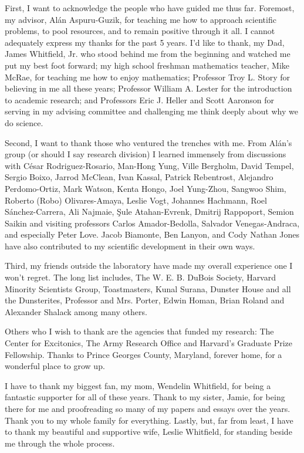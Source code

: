 \begin{acknowledgments}

First, I want to acknowledge the people who have guided me thus far. Foremost, my advisor, Al{\'a}n Aspuru-Guzik, for teaching me how to approach scientific problems, to pool resources, and to remain positive through it all.   I cannot adequately express my thanks for the past 5 years.  I'd like to thank, my Dad, James Whitfield, Jr. who stood behind me from the beginning and watched me put my best foot forward; my high school freshman mathematics teacher, Mike McRae, for teaching me how to enjoy mathematics; Professor Troy L. Story for believing in me all these years; Professor William A. Lester for the introduction to academic research; and Professors Eric J. Heller and Scott Aaronson for serving in my advising committee and challenging me think deeply about why we do science.

Second, I want to thank those who ventured the trenches with me.  From Al{\'a}n's group (or should I say research division) I learned immensely from discussions with C\'esar Rodriguez-Rosario, Man-Hong Yung, Ville Bergholm, David Tempel, Sergio Boixo, Jarrod McClean, Ivan Kassal, Patrick Rebentrost, Alejandro Perdomo-Ortiz, Mark Watson, Kenta Hongo, Joel Yung-Zhou, Sangwoo Shim, Roberto (Robo) Olivares-Amaya, Leslie Vogt, Johannes Hachmann, Roel S\'anchez-Carrera, Ali Najmaie, \c{S}ule Atahan-Evrenk, Dmitrij Rappoport, Semion Saikin and visiting professors Carlos Amador-Bedolla, Salvador Venegas-Andraca, and especially Peter Love. Jacob Biamonte, Ben Lanyon, and  Cody Nathan Jones have also contributed to my scientific development in their own ways.

Third, my friends outside the laboratory have made my overall experience one I won't regret.  The long list includes, The W. E. B. DuBois Society, Harvard Minority Scientists Group, Toastmasters, Kunal Surana, Dunster House and all the Dunsterites, Professor and Mrs. Porter, Edwin Homan, Brian Roland and Alexander Shalack among many others. 

Others who I wish to thank are the agencies that funded my research: The Center for Excitonics, The Army Research Office and Harvard's Graduate Prize Fellowship. Thanks to Prince Georges County, Maryland, forever home, for a wonderful place to grow up. 

I have to thank my biggest fan, my mom, Wendelin Whitfield, for being a fantastic supporter for all of these years. Thank to my sister, Jamie, for being there for me and proofreading so many of my papers and essays over the years.  Thank you to my whole family for everything.  Lastly, but, far from least, I have to thank my beautiful and supportive wife, Leslie Whitfield, for standing beside me through the whole process.  

\end{acknowledgments}


